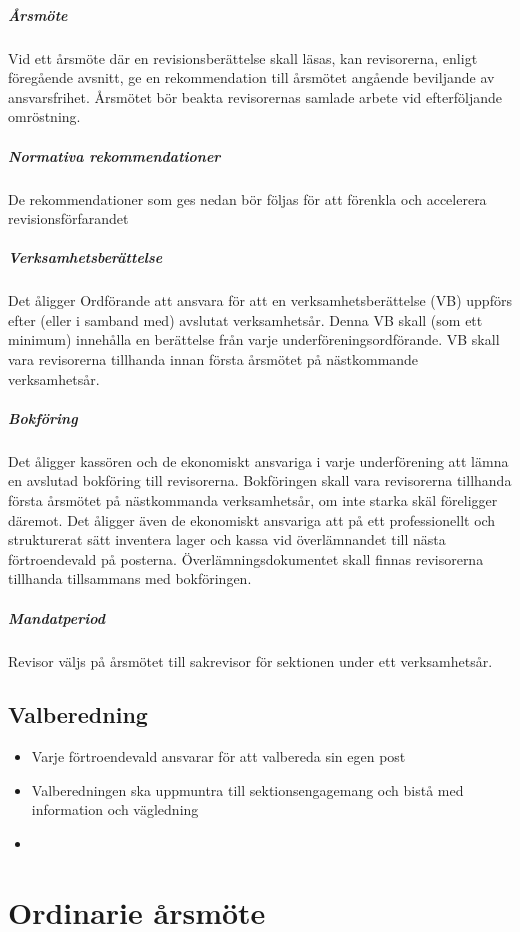 \documentclass{../resources/dgovdoc}
\begin{document}
\subparagraph{Årsmöte}

Vid ett årsmöte där en revisionsberättelse skall läsas, kan revisorerna, enligt föregående avsnitt, ge en rekommendation till årsmötet angående beviljande av ansvarsfrihet. Årsmötet bör beakta revisorernas samlade arbete vid efterföljande omröstning.

\subparagraph{Normativa rekommendationer}

De rekommendationer som ges nedan bör följas för att förenkla och accelerera revisionsförfarandet

\subparagraph{Verksamhetsberättelse}

Det åligger Ordförande att ansvara för att en verksamhetsberättelse (VB) uppförs efter (eller i samband med) avslutat verksamhetsår. Denna VB skall (som ett minimum) innehålla en berättelse från varje underföreningsordförande. VB skall vara revisorerna tillhanda innan första årsmötet på nästkommande verksamhetsår.

\subparagraph{Bokföring}

Det åligger kassören och de ekonomiskt ansvariga i varje underförening att lämna en avslutad bokföring till revisorerna. Bokföringen skall vara revisorerna tillhanda första årsmötet på nästkommanda verksamhetsår, om inte starka skäl föreligger däremot.
Det åligger även de ekonomiskt ansvariga att på ett professionellt och strukturerat sätt inventera lager och kassa vid överlämnandet till nästa förtroendevald på posterna. Överlämningsdokumentet skall finnas revisorerna tillhanda tillsammans med bokföringen. 

\subparagraph{Mandatperiod}

Revisor väljs på årsmötet till sakrevisor för sektionen under ett verksamhetsår.

\subsection{Valberedning}

\begin{itemize}

\item Varje förtroendevald ansvarar för att valbereda sin egen post
\item Valberedningen ska uppmuntra till sektionsengagemang och bistå med information och vägledning
\item 

\end{itemize}

\section{Ordinarie årsmöte}
\end{document}
